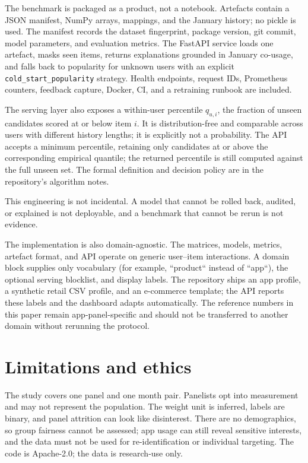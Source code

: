 \documentclass[11pt]{article}
\begin{document}
The benchmark is packaged as a product, not a notebook. Artefacts contain a JSON manifest, NumPy arrays, mappings, and the January history; no pickle is used. The manifest records the dataset fingerprint, package version, git commit, model parameters, and evaluation metrics. The FastAPI service loads one artefact, masks seen items, returns explanations grounded in January co-usage, and falls back to popularity for unknown users with an explicit \texttt{cold\_start\_popularity} strategy. Health endpoints, request IDs, Prometheus counters, feedback capture, Docker, CI, and a retraining runbook are included.

The serving layer also exposes a within-user percentile $q_{u,i}$, the fraction of unseen candidates scored at or below item $i$. It is distribution-free and comparable across users with different history lengths; it is explicitly not a probability. The API accepts a minimum percentile, retaining only candidates at or above the corresponding empirical quantile; the returned percentile is still computed against the full unseen set. The formal definition and decision policy are in the repository's algorithm notes.

This engineering is not incidental. A model that cannot be rolled back, audited, or explained is not deployable, and a benchmark that cannot be rerun is not evidence.

The implementation is also domain-agnostic. The matrices, models, metrics, artefact format, and API operate on generic user--item interactions. A domain block supplies only vocabulary (for example, ``product`` instead of ``app``), the optional serving blocklist, and display labels. The repository ships an app profile, a synthetic retail CSV profile, and an e-commerce template; the API reports these labels and the dashboard adapts automatically. The reference numbers in this paper remain app-panel-specific and should not be transferred to another domain without rerunning the protocol.

\section{Limitations and ethics}

The study covers one panel and one month pair. Panelists opt into measurement and may not represent the population. The weight unit is inferred, labels are binary, and panel attrition can look like disinterest. There are no demographics, so group fairness cannot be assessed; app usage can still reveal sensitive interests, and the data must not be used for re-identification or individual targeting. The code is Apache-2.0; the data is research-use only.
\end{document}
